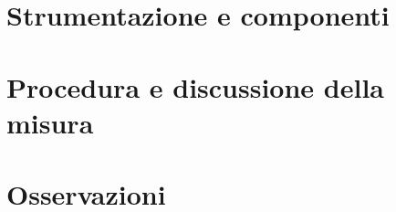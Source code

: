 \documentclass[a4paper,notitlepage,10pt]{article}
\begin{document}


\section{Strumentazione e componenti}

\section[Procedura]{Procedura e discussione della misura}

\section{Osservazioni}
\end{document}
